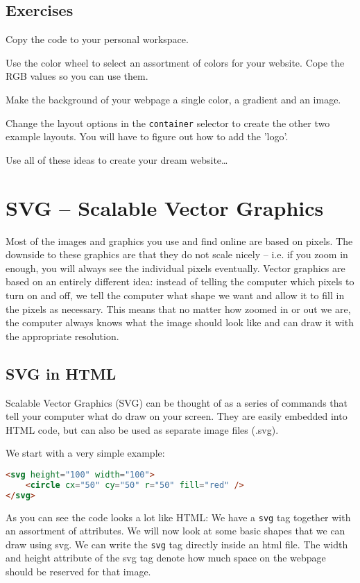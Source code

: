 \documentclass[english,11pt,a4paper]{report}
\begin{document}
\subsection{Exercises}
\begin{ex}
Copy the code to your personal workspace. 
\end{ex}
\begin{ex}
Use the color wheel to select an assortment of colors for your website. Cope the RGB values so you can use them.
\end{ex}
\begin{ex}
Make the background of your webpage a single color, a gradient and an image.
\end{ex}
\begin{ex}
Change the layout options in the \verb|container| selector to create the other two example layouts. You will have to figure out how to add the 'logo'.
\end{ex}

\begin{ex}
Use all of these ideas to create your dream website\ldots
\end{ex}


\newpage
\section{SVG -- Scalable Vector Graphics}

Most of the images  and graphics you use and find online are based on pixels. The downside to these graphics are that they do not scale nicely -- i.e. if you zoom in enough, you will always see the individual pixels eventually. Vector graphics are based on an entirely different idea: instead of telling the computer which pixels to turn on and off, we tell the computer what shape we want and allow it to fill in the pixels as necessary. This means that no matter how zoomed in or out we are, the computer always knows what the image should look like and can draw it with the appropriate resolution.

\subsection{SVG in HTML}
Scalable Vector Graphics (SVG) can be thought of as a series of commands that tell your computer what do draw on your screen. They are easily embedded into HTML code, but can also be used as separate image files (.svg).



We start with a very simple example: 
\begin{lstlisting}[language=html]
<svg height="100" width="100">
    <circle cx="50" cy="50" r="50" fill="red" />
</svg>
\end{lstlisting}
As you can see the code looks a lot like HTML: We  have a \verb|svg| tag together with an assortment of attributes. We will now look at some basic shapes that we can draw using svg. We can write the \verb|svg| tag directly inside an html file. The width and height attribute of the svg tag denote how much space on the webpage should be reserved for that image.
\end{document}
